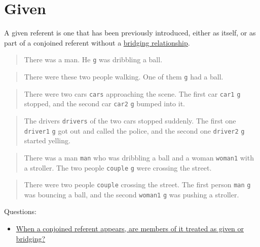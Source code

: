 \documentclass[
]{book}
\providecommand{\tightlist}{%
  \setlength{\itemsep}{0pt}\setlength{\parskip}{0pt}}
\begin{document}
\hypertarget{given}{%
\section{Given}\label{given}}

A given referent is one that has been previously introduced,
either as itself,
or as part of a conjoined referent without a \protect\hyperlink{bridging-relationships}{bridging relationship}.

\begin{quote}
There was a man.
He \texttt{g} was dribbling a ball.
\end{quote}

\begin{quote}
There were these two people walking.
One of them \texttt{g} had a ball.
\end{quote}

\begin{quote}
There were two cars \texttt{cars} approaching the scene.
The first car \texttt{car1} \texttt{g} stopped, and the second car \texttt{car2} \texttt{g} bumped into it.
\end{quote}

\begin{quote}
The drivers \texttt{drivers} of the two cars stopped suddenly.
The first one \texttt{driver1} \texttt{g} got out and called the police,
and the second one \texttt{driver2} \texttt{g} started yelling.
\end{quote}

\begin{quote}
There was a man \texttt{man} who was dribbling a ball and a woman \texttt{woman1} with a stroller.
The two people \texttt{couple} \texttt{g} were crossing the street.
\end{quote}

\begin{quote}
There were two people \texttt{couple} crossing the street.
The first person \texttt{man} \texttt{g} was bouncing a ball,
and the second \texttt{woman1} \texttt{g} was pushing a stroller.
\end{quote}

Questions:

\begin{itemize}
\tightlist
\item
  \protect\hyperlink{conjoined-referent-members}{When a conjoined referent appears, are members of it treated as given or bridging?}
\end{itemize}
\end{document}
